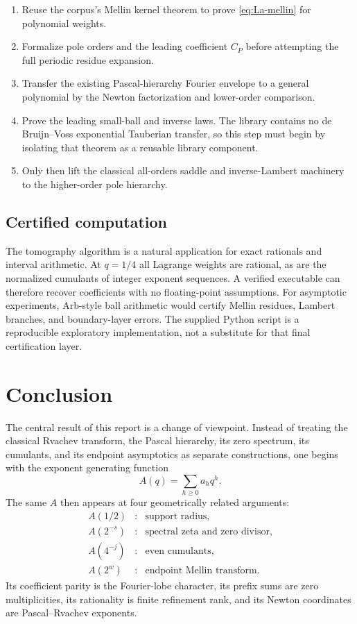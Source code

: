\documentclass[11pt,oneside]{article}
\numberwithin{equation}{section}
\theoremstyle{definition}
\theoremstyle{remark}
\begin{document}
\begin{enumerate}
\item Reuse the corpus's Mellin kernel theorem to prove \eqref{eq:La-mellin} for polynomial
      weights.
\item Formalize pole orders and the leading coefficient $C_P$ before attempting the full
      periodic residue expansion.
\item Transfer the existing Pascal-hierarchy Fourier envelope to a general polynomial by
      the Newton factorization and lower-order comparison.
\item Prove the leading small-ball and inverse laws.  The library contains no de
      Bruijn--Voss exponential Tauberian transfer, so this step must begin by isolating that
      theorem as a reusable library component.
\item Only then lift the classical all-orders saddle and inverse-Lambert machinery to the
      higher-order pole hierarchy.
\end{enumerate}

\subsection{Certified computation}

The tomography algorithm is a natural application for exact rationals and interval
arithmetic.  At $q=1/4$ all Lagrange weights are rational, as are the normalized cumulants of
integer exponent sequences.  A verified executable can therefore recover coefficients with
no floating-point assumptions.  For asymptotic experiments, Arb-style ball arithmetic would
certify Mellin residues, Lambert branches, and boundary-layer errors.  The supplied Python
script is a reproducible exploratory implementation, not a substitute for that final
certification layer.


\section{Conclusion}
\label{sec:conclusion}

The central result of this report is a change of viewpoint.  Instead of treating the
classical Rvachev transform, the Pascal hierarchy, its zero spectrum, its cumulants, and its
endpoint asymptotics as separate constructions, one begins with the exponent generating
function
\[
 A(q)=\sum_{h\ge0}a_hq^h.
\]
The same $A$ then appears at four geometrically related arguments:
\begin{equation}
 \begin{array}{ccl}
 A(1/2) &:& \text{support radius},\\
 A(2^{-s}) &:& \text{spectral zeta and zero divisor},\\
 A(4^{-j}) &:& \text{even cumulants},\\
 A(2^w) &:& \text{endpoint Mellin transform}.
 \end{array}
 \label{eq:four-samples-summary}
\end{equation}
Its coefficient parity is the Fourier-lobe character, its prefix sums are zero
multiplicities, its rationality is finite refinement rank, and its Newton coordinates are
Pascal--Rvachev exponents.
\end{document}
